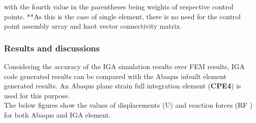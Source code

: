 \documentclass[11pt]{article}
\begin{document}
\begin{enumerate}
\begin{center}
\begin{tabular}{ |c|c|c|c|c| }
		\end{tabular}
	\end{center}
	with the fourth value in the parentheses being weights of respective control points.
	**As this is the case of single element, there is no need for the control point
	assembly array and knot vector connectivity matrix.
\end{enumerate}
\subsubsection{Results and discussions} \label{ResultsMech}
Considering the accuracy of the IGA simulation results over FEM results, IGA code generated results can be compared with the Abaqus inbuilt element generated results. An Abaqus plane strain full integration element (\textbf{CPE4}) \cite{abaqus10version} is used for this purpose.
\\The below figures show the values of displacements (U) and reaction forces (RF ) for both Abaqus and IGA element.\\
\end{document}
